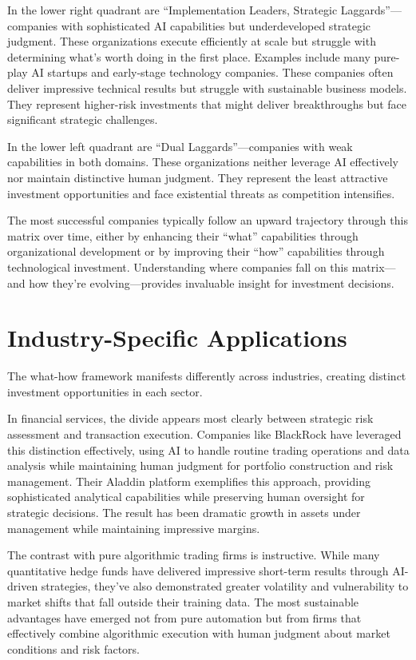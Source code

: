 \documentclass[
  Letterpaper,
]{scrbook}
\begin{document}
In the lower right quadrant are ``Implementation Leaders, Strategic
Laggards''---companies with sophisticated AI capabilities but
underdeveloped strategic judgment. These organizations execute
efficiently at scale but struggle with determining what's worth doing in
the first place. Examples include many pure-play AI startups and
early-stage technology companies. These companies often deliver
impressive technical results but struggle with sustainable business
models. They represent higher-risk investments that might deliver
breakthroughs but face significant strategic challenges.

In the lower left quadrant are ``Dual Laggards''---companies with weak
capabilities in both domains. These organizations neither leverage AI
effectively nor maintain distinctive human judgment. They represent the
least attractive investment opportunities and face existential threats
as competition intensifies.

The most successful companies typically follow an upward trajectory
through this matrix over time, either by enhancing their ``what''
capabilities through organizational development or by improving their
``how'' capabilities through technological investment. Understanding
where companies fall on this matrix---and how they're
evolving---provides invaluable insight for investment decisions.

\section{Industry-Specific
Applications}\label{industry-specific-applications}

The what-how framework manifests differently across industries, creating
distinct investment opportunities in each sector.

In financial services, the divide appears most clearly between strategic
risk assessment and transaction execution. Companies like BlackRock have
leveraged this distinction effectively, using AI to handle routine
trading operations and data analysis while maintaining human judgment
for portfolio construction and risk management. Their Aladdin platform
exemplifies this approach, providing sophisticated analytical
capabilities while preserving human oversight for strategic decisions.
The result has been dramatic growth in assets under management while
maintaining impressive margins.

The contrast with pure algorithmic trading firms is instructive. While
many quantitative hedge funds have delivered impressive short-term
results through AI-driven strategies, they've also demonstrated greater
volatility and vulnerability to market shifts that fall outside their
training data. The most sustainable advantages have emerged not from
pure automation but from firms that effectively combine algorithmic
execution with human judgment about market conditions and risk factors.
\end{document}
